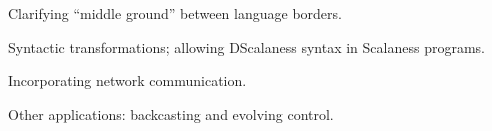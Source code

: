 
\begin{citemize}
\item Clarifying ``middle ground'' between language borders.
\item Syntactic transformations; allowing DScalaness syntax in Scalaness programs.
\item Incorporating network communication. 
\item Other applications: backcasting and evolving control.
\end{citemize}
\stopslide


\makeatletter
{}
\makeatother
\stopslide

